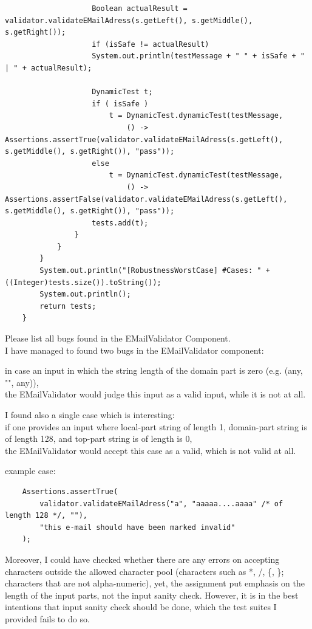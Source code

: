 \documentclass[a4paper,9pt,oneside]{scrreprt}
\begin{document}
\begin{enumerate}[a)]
\begin{lstlisting}
					Boolean actualResult = validator.validateEMailAdress(s.getLeft(), s.getMiddle(), s.getRight());
					if (isSafe != actualResult)
					System.out.println(testMessage + " " + isSafe + " | " + actualResult);
					
					DynamicTest t;
					if ( isSafe )
						t = DynamicTest.dynamicTest(testMessage,
							() -> Assertions.assertTrue(validator.validateEMailAdress(s.getLeft(), s.getMiddle(), s.getRight()), "pass"));
					else
						t = DynamicTest.dynamicTest(testMessage,
							() -> Assertions.assertFalse(validator.validateEMailAdress(s.getLeft(), s.getMiddle(), s.getRight()), "pass"));
					tests.add(t);
				}
			}
		}
		System.out.println("[RobustnessWorstCase] #Cases: " + ((Integer)tests.size()).toString());
		System.out.println();
		return tests;
	}
\end{lstlisting}

		
		\clearpage
		\item Please list all bugs found in the EMailValidator Component.\\
		
		
		I have managed to found two bugs in the EMailValidator component:
		\bigskip
		\end{compactitem}
			
		Moreover, I could have checked whether there are any errors on accepting characters outside the allowed character pool (characters such as *, /, \{, \}; characters that are not alpha-numeric), yet, the assignment put emphasis on the length of the input parts, not the input sanity check. However, it is in the best intentions that input sanity check should be done, which the test suites I provided fails to do so.
	\end{enumerate}
\end{document}

